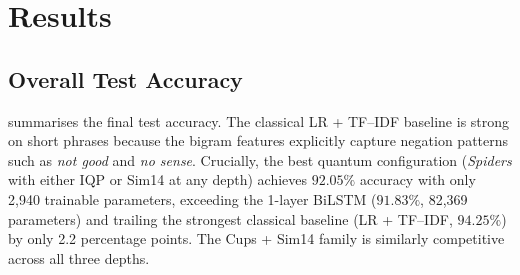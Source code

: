 \documentclass[runningheads]{llncs}
\begin{document}
\section{Results}\label{sec:results}

\subsection{Overall Test Accuracy}

 summarises the final test accuracy. The classical
LR + TF--IDF baseline is strong on short phrases because the bigram features
explicitly capture negation patterns such as \emph{not good} and
\emph{no sense}. Crucially, the best quantum configuration (\emph{Spiders}
with either IQP or Sim14 at any depth) achieves \(92.05\%\) accuracy with
only 2{,}940 trainable parameters, exceeding the 1-layer BiLSTM
(\(91.83\%\), 82{,}369 parameters) and trailing the strongest classical
baseline (LR + TF--IDF, \(94.25\%\)) by only 2.2 percentage points. The
Cups + Sim14 family is similarly competitive across all three depths.
\end{document}
